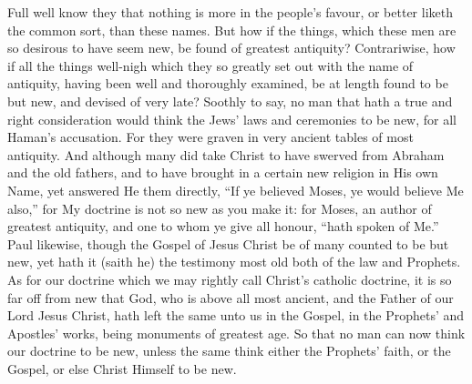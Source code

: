 Full well know they that nothing is more in the people’s favour,
or better liketh the common sort, than these names. But how if
the things, which these men are so desirous to have seem new, be found
of greatest antiquity? Contrariwise, how if all the things well-nigh
which they so greatly set out with the name of antiquity, having been
well and thoroughly examined, be at length found to be but new, and
devised of very late? Soothly to say, no man that hath a true
and right consideration would think the Jews’ laws and ceremonies
to be new, for all Haman’s accusation. For they were graven
in very ancient tables of most antiquity. And although many did
take Christ to have swerved from
Abraham and the old fathers, and to have brought in a certain new religion
in His own Name, yet answered He them directly, “If ye believed
Moses, ye would believe Me also,” for My doctrine is not so new
as you make it: for Moses, an author of greatest antiquity, and one
to whom ye give all honour, “hath spoken of Me.” Paul
likewise, though the Gospel of Jesus Christ be of many counted to be
but new, yet hath it (saith he) the testimony most old both of the law
and Prophets. As for our doctrine which we may rightly call Christ’s
catholic doctrine, it is so far off from new that God, who is above
all most ancient, and the Father of our Lord Jesus Christ, hath left
the same unto us in the Gospel, in the Prophets’ and Apostles’
works, being monuments of greatest age. So that no man can now
think our doctrine to be new, unless the same think either the Prophets’
faith, or the Gospel, or else Christ Himself to be new.

